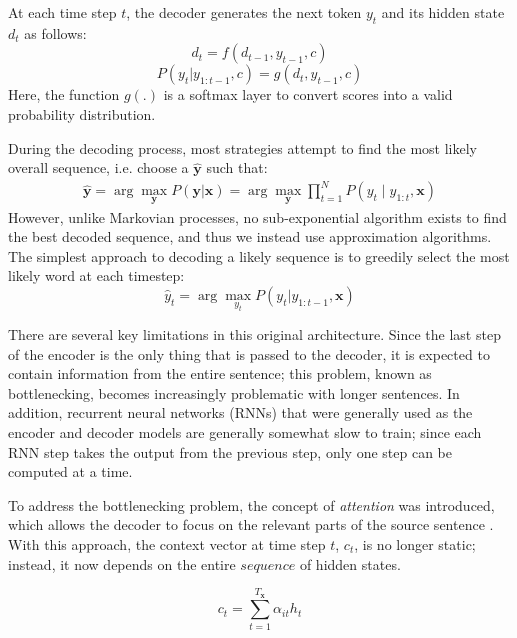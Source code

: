 \documentclass[thesis.tex]{subfiles}
\begin{document}
At each time step $t$, the decoder generates the next token $y_t$ and its hidden state $d_t$ as follows:
\begin{equation*}
	d_t = f(d_{t-1}, y_{t-1}, c)
\end{equation*}
\begin{equation*}
    \label{eqn:seq2seq-decode}
	P(y_t|y_{1:t-1}, c) = g(d_t, y_{t-1}, c)
\end{equation*}
Here, the function $g(.)$ is a softmax layer to convert scores into a valid probability distribution.

During the decoding process, most strategies attempt to find the most likely overall sequence, i.e. choose a $\mathbf{\hat{y}}$ such that:
\begin{align*}
    \mathbf{\hat{y}} = \arg\max_{\mathbf{y}}{ P(\mathbf{y} | \mathbf{x})} = \arg\max_{\mathbf{y}}{\prod_{t=1}^{N} {P(y_t \mid y_{1:t}, \mathbf{x})}}
\end{align*}
However, unlike Markovian processes, no sub-exponential algorithm exists to find the best decoded sequence, and thus we instead use approximation algorithms. The simplest approach to decoding a likely sequence is to greedily select the most likely word at each timestep:
\begin{equation*}
    \hat{y}_t = \arg\max_{y_t}{ P(y_t | y_{1:t-1}, \mathbf{x})}
\end{equation*}

There are several key limitations in this original architecture. Since the last step of the encoder is the only thing that is passed to the decoder, it is expected to contain information from the entire sentence; this problem, known as bottlenecking, becomes increasingly problematic with longer sentences. In addition, recurrent neural networks (RNNs) that were generally used as the encoder and decoder models are generally somewhat slow to train; since each RNN step takes the output from the previous step, only one step can be computed at a time.

To address the bottlenecking problem, the concept of \textit{attention} was introduced, which allows the decoder to focus on the relevant parts of the source sentence \citep{bahdanau2014neural,luong2015effective}. With this approach, the context vector at time step $t$, $c_t$, is no longer static; instead, it now depends on the entire $sequence$ of hidden states.

\begin{equation*}
	c_t = \sum_{t=1}^{T_{\textbf{x}}} \alpha_{it}h_t
\end{equation*}
\end{document}
